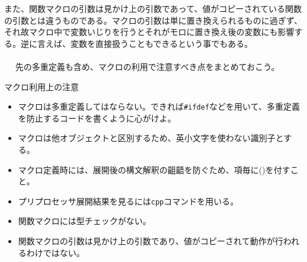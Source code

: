また、関数マクロの引数は見かけ上の引数であって、値がコピーされている関数の引数とは違うものである。マクロの引数は単に置き換えられるものに過ぎず、それ故マクロ中で変数いじりを行うとそれがモロに置き換え後の変数にも影響する。逆に言えば、変数を直接扱うこともできるという事でもある。
\\ \\　
先の多重定義も含め、マクロの利用で注意すべき点をまとめておこう。
\begin{itembox}[l]{マクロ利用上の注意}
\begin{itemize}
\item マクロは多重定義してはならない。できれば\verb|#ifdef|などを用いて、多重定義を防止するコードを書くように心がけよ。
\item マクロは他オブジェクトと区別するため、英小文字を使わない識別子とする。
\item マクロ定義時には、展開後の構文解釈の齟齬を防ぐため、項毎に()を付すこと。
\item プリプロセッサ展開結果を見るには\verb|cpp|コマンドを用いる。
\item 関数マクロには型チェックがない。
\item 関数マクロの引数は見かけ上の引数であり、値がコピーされて動作が行われるわけではない。
\end{itemize}
\end{itembox}

